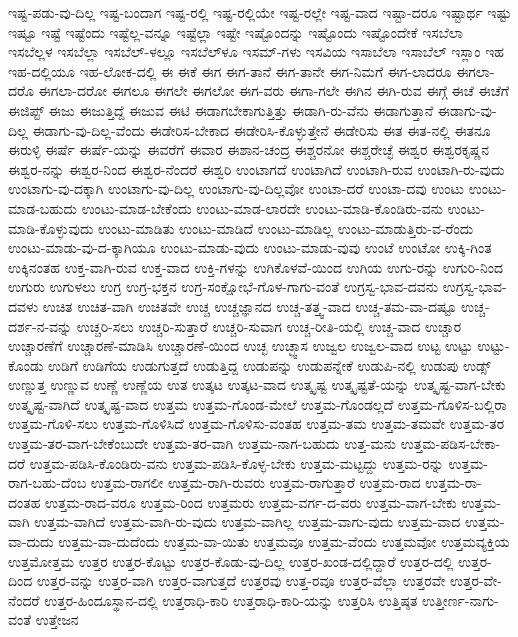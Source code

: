 {ಇಷ್ಟ-ಪಡು-ವು-ದಿಲ್ಲ
ಇಷ್ಟ-ಬಂದಾಗ
ಇಷ್ಟ-ರಲ್ಲಿ
ಇಷ್ಟ-ರಲ್ಲಿಯೇ
ಇಷ್ಟ-ರಲ್ಲೇ
ಇಷ್ಟ-ವಾದ
ಇಷ್ಟಾ-ದರೂ
ಇಷ್ಟಾರ್ಥ
ಇಷ್ಟು
ಇಷ್ಟೂ
ಇಷ್ಟೆ
ಇಷ್ಟೆಂದು
ಇಷ್ಟೆಲ್ಲ-ವನ್ನೂ
ಇಷ್ಟೆಲ್ಲಾ
ಇಷ್ಟೇ
ಇಷ್ಟೊಂದನ್ನು
ಇಷ್ಟೊಂದು
ಇಷ್ಟೊಂದೇಕೆ
ಇಸಬೆಲಾ
ಇಸಬೆಲ್ಲಳ
ಇಸಬೆಲ್ಲಾ
ಇಸಬೆಲ್‌-ಳಲ್ಲೂ
ಇಸಬೆಲ್‌ಳೂ
ಇಸಮ್‌-ಗಳು
ಇಸವಿಯ
ಇಸಾಬೆಲಾ
ಇಸಾಬೆಲ್
ಇಸ್ಲಾಂ
ಇಹ
ಇಹ-ದಲ್ಲಿಯೂ
ಇಹ-ಲೋಕ-ದಲ್ಲಿ
ಈ
ಈಕೆ
ಈಗ
ಈಗ-ತಾನೆ
ಈಗ-ತಾನೇ
ಈಗ-ನಿಮಗೆ
ಈಗ-ಲಾದರೂ
ಈಗಲಾ-ದರೊ
ಈಗಲಾ-ದರೋ
ಈಗಲೂ
ಈಗಲೇ
ಈಗಲೋ
ಈಗ-ವರು
ಈಗಾ-ಗಲೇ
ಈಗಿನ
ಈಗಿ-ರುವ
ಈಗ್ಗೆ
ಈಚೆ
ಈಚೆಗೆ
ಈಜಿಪ್ಟ್
ಈಜು
ಈಜುತ್ತಿದ್ದೆ
ಈಜುವ
ಈಟಿ
ಈಡಾಗಬೇಕಾಗುತ್ತಿತ್ತು
ಈಡಾಗಿ-ರು-ವೆನು
ಈಡಾಗುತ್ತಾನೆ
ಈಡಾಗು-ವು-ದಿಲ್ಲ
ಈಡಾಗು-ವು-ದಿಲ್ಲ-ವೆಂದು
ಈಡೇರಿಸ-ಬೇಕಾದ
ಈಡೇರಿಸಿ-ಕೊಳ್ಳುತ್ತೇನೆ
ಈಡೇರಿಸು
ಈತ
ಈತ-ನಲ್ಲಿ
ಈತನೂ
ಈರುಳ್ಳಿ
ಈರ್ಷೆ
ಈರ್ಷೆ-ಯನ್ನು
ಈವರೆಗೆ
ಈವಾರ
ಈಶಾನ-ಚಂದ್ರ
ಈಶ್ಚರನೋ
ಈಶ್ಚರೇಚ್ಛೆ
ಈಶ್ವರ
ಈಶ್ವರಕೃಷ್ಣನ
ಈಶ್ವರ-ನನ್ನು
ಈಶ್ವರ-ನಿಂದ
ಈಶ್ವರ-ನೆಂದರೆ
ಈಶ್ವರಿ
ಉಂಟಾಗದೆ
ಉಂಟಾಗಿದೆ
ಉಂಟಾಗಿ-ರುವ
ಉಂಟಾಗಿ-ರು-ವುದು
ಉಂಟಾಗು-ವು-ದಕ್ಕಾಗಿ
ಉಂಟಾಗು-ವು-ದಿಲ್ಲ
ಉಂಟಾಗು-ವು-ದಿಲ್ಲವೋ
ಉಂಟಾ-ದರೆ
ಉಂಟಾ-ದವು
ಉಂಟು
ಉಂಟು-ಮಾಡ-ಬಹುದು
ಉಂಟು-ಮಾಡ-ಬೇಕೆಂದು
ಉಂಟು-ಮಾಡ-ಲಾರದೇ
ಉಂಟು-ಮಾಡಿ-ಕೊಂಡಿರು-ವನು
ಉಂಟು-ಮಾಡಿ-ಕೊಳ್ಳುವುದು
ಉಂಟು-ಮಾಡಿತು
ಉಂಟು-ಮಾಡಿದೆ
ಉಂಟು-ಮಾಡಿಲ್ಲ
ಉಂಟು-ಮಾಡುತ್ತಿರು-ವ-ರೆಂದು
ಉಂಟು-ಮಾಡು-ವು-ದ-ಕ್ಕಾಗಿಯೂ
ಉಂಟು-ಮಾಡು-ವುದು
ಉಂಟು-ಮಾಡು-ವುವು
ಉಂಟೆ
ಉಂಟೋ
ಉಕ್ಕಿ-ಗಿಂತ
ಉಕ್ಕಿನಂತಹ
ಉಕ್ತ-ವಾಗಿ-ರುವ
ಉಕ್ತ-ವಾದ
ಉಕ್ತಿ-ಗಳನ್ನು
ಉಗಿಕೊಳವೆ-ಯಿಂದ
ಉಗಿಯ
ಉಗು-ರನ್ನು
ಉಗುರಿ-ನಿಂದ
ಉಗುರು
ಉಗುಳಲು
ಉಗ್ರ
ಉಗ್ರ-ಭಕ್ತನ
ಉಗ್ರ-ಸಂಕ್ಷೋಭೆ-ಗೊಳ-ಗಾಗು-ವಂತೆ
ಉಗ್ರಸ್ವ-ಭಾವ-ದವನು
ಉಗ್ರಸ್ವ-ಭಾವ-ದವಳು
ಉಚಿತ
ಉಚಿತ-ವಾಗಿ
ಉಚಿತವೇ
ಉಚ್ಚ
ಉಚ್ಚಜ್ಞಾನದ
ಉಚ್ಚ-ತತ್ತ್ವ-ವಾದ
ಉಚ್ಚ-ತಮ-ವಾ-ದಷ್ಟೂ
ಉಚ್ಚ-ದರ್ಶ-ನ-ವನ್ನು
ಉಚ್ಚರಿ-ಸಲು
ಉಚ್ಚರಿ-ಸುತ್ತಾರೆ
ಉಚ್ಚರಿ-ಸುವಾಗ
ಉಚ್ಚ-ರೀತಿ-ಯಲ್ಲಿ
ಉಚ್ಚ-ವಾದ
ಉಚ್ಚಾರ
ಉಚ್ಚಾರಣೆಗೆ
ಉಚ್ಚಾರಣೆ-ಮಾಡಿಸಿ
ಉಚ್ಚಾರಣೆ-ಯಿಂದ
ಉಚ್ಛ
ಉಚ್ಛ್ವಾಸ
ಉಜ್ವಲ
ಉಜ್ವಲ-ವಾದ
ಉಟ್ಟ
ಉಟ್ಟು
ಉಟ್ಟು-ಕೊಂಡು
ಉಡಿಗೆ
ಉಡಿಗೆಯ
ಉಡುಗುತ್ತದೆ
ಉಡುತ್ತಿದ್ದ
ಉಡುಪನ್ನು
ಉಡುಪನ್ನೇಕೆ
ಉಡುಪಿ-ನಲ್ಲಿ
ಉಡುಪು
ಉಡ್ಸ್
ಉಣ್ಣುತ್ತ
ಉಣ್ಣುವ
ಉಣ್ಣೆ
ಉಣ್ಣೆಯ
ಉತ
ಉತ್ಕಟ
ಉತ್ಕಟ-ವಾದ
ಉತ್ಕೃಷ್ಟ
ಉತ್ಕೃಷ್ಟತೆ-ಯನ್ನು
ಉತ್ಕೃಷ್ಟ-ವಾಗ-ಬೇಕು
ಉತ್ಕೃಷ್ಟ-ವಾಗಿದೆ
ಉತ್ಕೃಷ್ಟ-ವಾದ
ಉತ್ತಮ
ಉತ್ತಮ-ಗೊಂಡ-ಮೇಲೆ
ಉತ್ತಮ-ಗೊಂಡಲ್ಲದೆ
ಉತ್ತಮ-ಗೊಳಿಸ-ಬಲ್ಲಿರಾ
ಉತ್ತಮ-ಗೊಳಿ-ಸಲು
ಉತ್ತಮ-ಗೊಳಿಸಿದೆ
ಉತ್ತಮ-ಗೊಳಿಸು-ವಂತಹ
ಉತ್ತಮ-ತಮ
ಉತ್ತಮ-ತಮವೇ
ಉತ್ತಮ-ತರ
ಉತ್ತಮ-ತರ-ವಾಗ-ಬೇಕೆಂಬುದೇ
ಉತ್ತಮ-ತರ-ವಾಗಿ
ಉತ್ತಮ-ನಾಗ-ಬಹುದು
ಉತ್ತ-ಮನು
ಉತ್ತಮ-ಪಡಿಸ-ಬೇಕಾ-ದರೆ
ಉತ್ತಮ-ಪಡಿಸಿ-ಕೊಂಡಿರು-ವನು
ಉತ್ತಮ-ಪಡಿಸಿ-ಕೊಳ್ಳ-ಬೇಕು
ಉತ್ತಮ-ಮಟ್ಟದ್ದು
ಉತ್ತಮ-ರನ್ನು
ಉತ್ತಮ-ರಾಗ-ಬಹು-ದೆಂಬ
ಉತ್ತಮ-ರಾಗಲೀ
ಉತ್ತಮ-ರಾಗಿ-ರುವರು
ಉತ್ತಮ-ರಾಗುತ್ತಾರೆ
ಉತ್ತಮ-ರಾದ
ಉತ್ತಮ-ರಾ-ದಂತಹ
ಉತ್ತಮ-ರಾದ-ವರೂ
ಉತ್ತಮ-ರಿಂದ
ಉತ್ತಮರು
ಉತ್ತಮ-ವರ್ಗ-ದ-ವರು
ಉತ್ತಮ-ವಾಗ-ಬೇಕು
ಉತ್ತಮ-ವಾಗಿ
ಉತ್ತಮ-ವಾಗಿದೆ
ಉತ್ತಮ-ವಾಗಿ-ರು-ವುದು
ಉತ್ತಮ-ವಾಗಿಲ್ಲ
ಉತ್ತಮ-ವಾಗು-ವುದು
ಉತ್ತಮ-ವಾದ
ಉತ್ತಮ-ವಾ-ದುದು
ಉತ್ತಮ-ವಾ-ದುದೆಂದು
ಉತ್ತಮ-ವಾ-ಯಿತು
ಉತ್ತಮವೂ
ಉತ್ತಮ-ವೆಂದು
ಉತ್ತಮವೋ
ಉತ್ತಮವ್ಯಕ್ತಿಯ
ಉತ್ತಮೋತ್ತಮ
ಉತ್ತರ
ಉತ್ತರ-ಕೊಟ್ಟು
ಉತ್ತರ-ಕೊಡು-ವು-ದಿಲ್ಲ
ಉತ್ತರ-ಖಂಡ-ದಲ್ಲಿದ್ದಾರೆ
ಉತ್ತರ-ದಲ್ಲಿ
ಉತ್ತರ-ದಿಂದ
ಉತ್ತರ-ವನ್ನು
ಉತ್ತರ-ವಾಗಿ
ಉತ್ತರ-ವಾಗುತ್ತದೆ
ಉತ್ತರವು
ಉತ್ತ-ರವೂ
ಉತ್ತರ-ವೆಲ್ಲಾ
ಉತ್ತರವೇ
ಉತ್ತರ-ವೇ-ನೆಂದರೆ
ಉತ್ತರ-ಹಿಂದೂಸ್ಥಾನ-ದಲ್ಲಿ
ಉತ್ತರಾಧಿ-ಕಾರಿ
ಉತ್ತರಾಧಿ-ಕಾರಿ-ಯನ್ನು
ಉತ್ತರಿಸಿ
ಉತ್ತಿಷ್ಠತ
ಉತ್ತೀರ್ಣ-ನಾಗು-ವಂತೆ
ಉತ್ತೇಜನ
}
